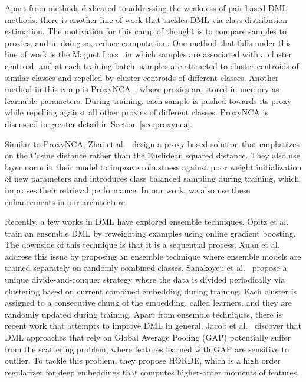\documentclass[runningheads]{llncs}
\begin{document}
Apart from methods dedicated to addressing the weakness of pair-based DML methods, there is another line of work that tackles DML via class distribution estimation. The motivation for this camp of thought is to compare samples to proxies, and in doing so, reduce computation.  One method that falls under this line of work is the Magnet Loss~\cite{rippel2015metric} in which samples are associated with a cluster centroid, and at each training batch, samples are attracted to cluster centroids of similar classes and repelled by cluster centroids of different classes. Another method in this camp is ProxyNCA~\cite{movshovitz2017no}, where proxies are stored in memory as learnable parameters. During training, each sample is pushed towards its proxy while repelling against all other proxies of different classes. ProxyNCA is discussed in greater detail in Section \ref{sec:proxynca}.

Similar to ProxyNCA, Zhai et al.~\cite{zhai2019} design a proxy-based solution that emphasizes on the Cosine distance rather than the Euclidean squared distance. They also use layer norm in their model to improve robustness against poor weight initialization of new parameters and introduces class balanced sampling during training, which improves their retrieval performance. In our work, we also use these enhancements in our architecture.

Recently, a few works in DML have explored ensemble techniques. 
Opitz et al.~\cite{Opitz_2017_ICCV} train an ensemble DML by reweighting examples using online gradient boosting. 
The downside of this technique is that it is a sequential process. 
Xuan et al.~\cite{xuan2018deep} address this issue by proposing an ensemble technique where ensemble models are trained separately on randomly combined classes.
Sanakoyeu et al.~\cite{sanakoyeu2019divide} propose a unique divide-and-conquer strategy where the data is divided periodically via clustering based on current combined embedding during training. Each cluster is assigned to a consecutive chunk of the embedding, called learners, and they are randomly updated during training. Apart from ensemble techniques, there is recent work that attempts to improve DML in general. Jacob et al.~\cite{jacob2019metric} discover that DML approaches that rely on Global Average Pooling (GAP) potentially suffer from the scattering problem, where features learned with GAP are sensitive to outlier. To tackle this problem, they propose HORDE, which is a high order regularizer for deep embeddings that computes higher-order moments of features.
\end{document}
